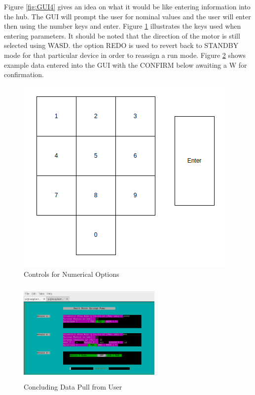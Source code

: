 \documentclass[journal]{IEEEtran}
\begin{document}
            Figure \ref{fig:GUI4} gives an idea on what it would be like entering information into the hub. The GUI will prompt the user for nominal values and the user will enter then using the number keys and enter. Figure \ref{fig:key_num} illustrates the keys used when entering parameters. It should be noted that the direction of the motor is still selected using WASD. the option REDO is used to revert back to STANDBY mode for that particular device in order to reassign a run mode. Figure \ref{fig:GUI6} shows example data entered into the GUI with the CONFIRM below awaiting a W for confirmation. 
            
            \begin{figure}[H]
                \centering
                \includegraphics[scale = 0.35]{KeySel_number}
                \caption{Controls for Numerical Options}
                \label{fig:key_num}
            \end{figure}
            
            \begin{figure}[H]
                \centering
                \includegraphics[width=7cm, height=5cm]{GUI_6}
                \caption{Concluding Data Pull from User}
                \label{fig:GUI6}
            \end{figure}
            
\end{document}
